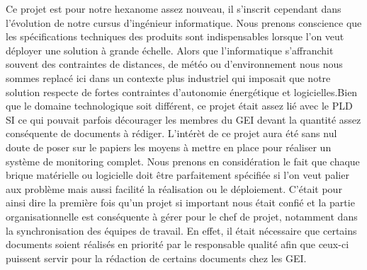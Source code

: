 Ce projet est pour notre hexanome assez nouveau, il s'inscrit cependant dans l'évolution de notre cursus d'ingénieur informatique. Nous prenons conscience que les spécifications techniques des produits sont indispensables lorsque l'on veut déployer une solution à grande échelle. Alors que l'informatique s'affranchit souvent des contraintes de distances, de météo ou d'environnement nous nous sommes replacé ici dans un contexte plus industriel qui imposait que notre solution respecte de fortes contraintes d'autonomie énergétique et logicielles.Bien que le domaine technologique soit différent, ce projet était assez lié avec le PLD SI ce qui pouvait parfois décourager les membres du GEI devant la quantité assez conséquente de documents à rédiger. L'intérèt de ce projet aura été sans nul doute de poser sur le papiers les moyens à mettre en place pour réaliser un système de monitoring complet. Nous prenons en considération le fait que chaque brique matérielle ou logicielle doit être parfaitement spécifiée si l'on veut palier aux problème mais aussi facilité la réalisation ou le déploiement. C'était pour ainsi dire la première fois qu'un projet si important nous était confié et la partie organisationnelle est conséquente à gérer pour le chef de projet, notamment dans la synchronisation des équipes de travail. En effet, il était nécessaire que certains documents soient réalisés en priorité par le responsable qualité afin que ceux-ci puissent servir pour la rédaction de certains documents chez les GEI.
